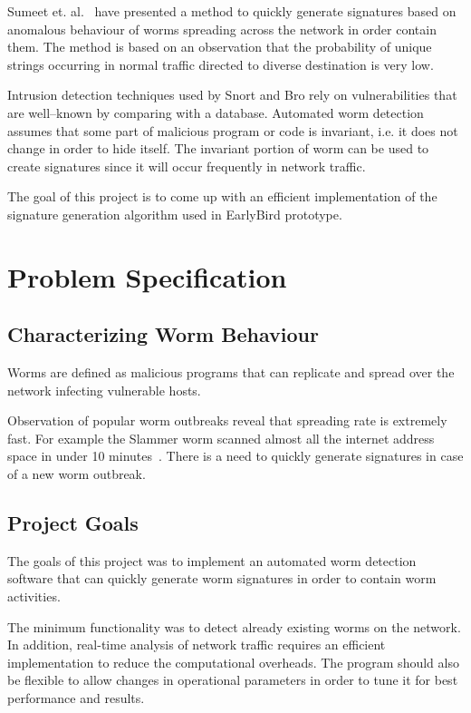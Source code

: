 \documentclass{report}
\begin{document}
Sumeet et. al.~\cite{DBLP:conf/osdi/SinghEVS04} have presented a method to quickly generate signatures based on anomalous behaviour of worms spreading across the network in order contain them. The method is based on an observation that the probability of unique strings occurring in normal traffic directed to diverse destination is very low.

Intrusion detection techniques used by Snort and Bro rely on vulnerabilities that are well--known by comparing with a database. Automated worm detection assumes that some part of malicious program or code is invariant, i.e. it does not change in order to hide itself. The invariant portion of worm can be used to create signatures since it will occur frequently in network traffic.

The goal of this project is to come up with an efficient implementation of the signature generation algorithm used in EarlyBird prototype.

\chapter{Problem Specification}

\section{Characterizing Worm Behaviour}
Worms are defined as malicious programs that can replicate and spread over the network infecting vulnerable hosts.

Observation of popular worm outbreaks reveal that spreading rate is extremely fast. For example the Slammer worm scanned almost all the internet address space in under 10 minutes~\cite{DBLP:conf/osdi/SinghEVS04}. There is a need to quickly generate signatures in case of a new worm outbreak.

\section{Project Goals}
The goals of this project was to implement an automated worm detection software that can quickly generate worm signatures in order to contain worm activities.

The minimum functionality was to detect already existing worms on the network. In addition, real-time analysis of network traffic requires an efficient implementation to reduce the computational overheads. The program should also be flexible to allow changes in operational parameters in order to tune it for best performance and results.
\end{document}

